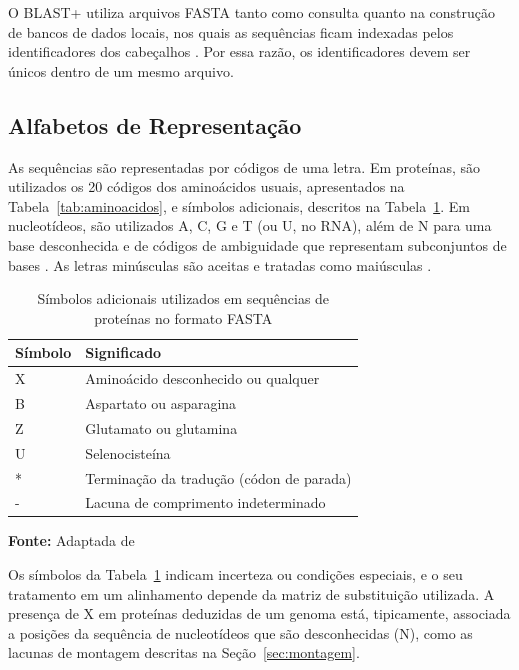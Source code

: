 O BLAST+ utiliza arquivos FASTA tanto como consulta quanto na construção de bancos de dados locais, nos quais as sequências ficam indexadas pelos identificadores dos cabeçalhos \cite{Camacho2009, NCBIBlast}. Por essa razão, os identificadores devem ser únicos dentro de um mesmo arquivo.

\subsection{Alfabetos de Representação}

As sequências são representadas por códigos de uma letra. Em proteínas, são utilizados os 20 códigos dos aminoácidos usuais, apresentados na Tabela~\ref{tab:aminoacidos}, e símbolos adicionais, descritos na Tabela~\ref{tab:simbolos}. Em nucleotídeos, são utilizados A, C, G e T (ou U, no RNA), além de N para uma base desconhecida e de códigos de ambiguidade que representam subconjuntos de bases \cite{NCBIBlast}. As letras minúsculas são aceitas e tratadas como maiúsculas \cite{NCBIBlast}.

\FloatBarrier
\begin{table}[!htbp]
	\centering
	\SingleSpacing\small
	\caption{Símbolos adicionais utilizados em sequências de proteínas no formato FASTA}
	\begin{tabularx}{\textwidth}{@{}lX@{}}
		\toprule
		\textbf{Símbolo} & \textbf{Significado} \\
		\midrule
		X       & Aminoácido desconhecido ou qualquer \\
		B       & Aspartato ou asparagina \\
		Z       & Glutamato ou glutamina \\
		U       & Selenocisteína \\
		*       & Terminação da tradução (códon de parada) \\
		-       & Lacuna de comprimento indeterminado \\
		\bottomrule
	\end{tabularx}
	\par\vspace{0.2cm}
	\textbf{Fonte:} Adaptada de 
	\label{tab:simbolos}
\end{table}
\FloatBarrier

Os símbolos da Tabela~\ref{tab:simbolos} indicam incerteza ou condições especiais, e o seu tratamento em um alinhamento depende da matriz de substituição utilizada. A presença de X em proteínas deduzidas de um genoma está, tipicamente, associada a posições da sequência de nucleotídeos que são desconhecidas (N), como as lacunas de montagem descritas na Seção~\ref{sec:montagem}.

